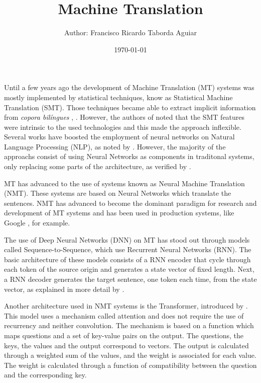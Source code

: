 \documentclass[a4paper]{article}
\title{
    Machine Translation\\
}
\author{
    \small{Author: Francisco Ricardo Taborda Aguiar}\\
}
\date{\today}
\begin{document}
    \maketitle

    Until a few years ago the development of Machine Translation (MT) 
    systems was mostly implemented by statistical techniques, know as 
    Statistical Machine Translation (SMT).
    Those techniques became able to extract implicit information from
    \emph{copora bil\'ingues} , \cite{brown:1993}.
    However, the authors of \cite{maruf:2021} noted that the SMT features
    were intrinsic to the used technologies and this made the approach
    inflexible. Several works have boosted the employment of neural 
    networks on Natural Language Processing (NLP), as noted by 
    \cite{goldberg:2016}.
    However, the majority of the approachs consist of using Neural Networks
    as components in traditonal systems, only replacing some parts of the
    architecture, as verified by \cite{stahlberg:2020}.

    MT has advanced to the use of systems known as 
    Neural Machine Translation (NMT). These systems are based on Neural 
    Networks which translate the sentences.
    NMT has advanced to become the dominant paradigm for research and 
    development of  MT systems and has been used in production systems,
    like Google \cite{wu:2016}, for example.

    The use of Deep Neural Networks (DNN) on MT has stood out through 
    models called Sequence-to-Sequence, which use Recurrent Neural Networks
    (RNN). The basic architecture of these models consists of a RNN encoder
    that cycle through each token of the source origin and generates a 
    state vector of fixed length.
    Next, a RNN decoder generates the target sentence, one token each time,
    from the state vector, as explained in more detail by \cite{sutskever:2014}.

    Another architecture used in NMT systems is the Transformer, introduced 
    by \cite{vaswani:2017attention}. This model uses a mechanism called attention 
    and does not require the use of recurrency and neither convolution. 
    The mechanism is based on a function which maps questions and a set of 
    key-value pairs on the output.
    The questions, the keys, the values and the output correspond to vectors.
    The output is calculated through a weighted sum of the values, and the 
    weight is associated for each value. The weight is calculated through
    a function of compatibility between the question and the corresponding 
    key.
\end{document}
